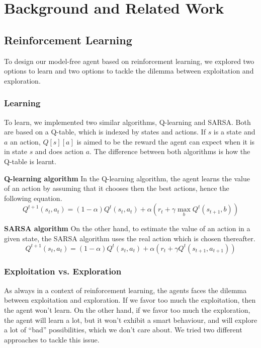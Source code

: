 \documentclass[journal, a4paper]{IEEEtran}
\begin{document}
\section{Background and Related Work}

\subsection{Reinforcement Learning}

To design our model-free agent based on reinforcement learning, we explored two options to learn and two options to tackle the dilemma between exploitation and exploration.

\subsubsection{Learning}

To learn, we implemented two similar algorithms, Q-learning and SARSA.
Both are based on a Q-table, which is indexed by states and actions. If $s$ is a state and $a$ an action, $Q[s][a]$ is aimed to be the reward the agent can expect when it is in state $s$ and does action $a$.
The difference between both algorithms is how the Q-table is learnt.

\textbf{Q-learning algorithm}
In the Q-learning algorithm, the agent learns the value of an action by assuming that it chooses then the best actions, hence the following equation.
\cite{lecture-rl}
\cite{lecture-rl2}
\cite{intro-rl}
\cite{qlearning}
\[
	Q^{t+1}(s_t, a_t) = (1-\alpha) Q^t(s_t, a_t) + \alpha (r_t + \gamma \max\limits_b Q^t(s_{t+1}, b))
\]

\textbf{SARSA algorithm}
On the other hand, to estimate the value of an action in a given state, the SARSA algorithm uses the real action which is chosen thereafter.
\cite{lecture-rl}
\cite{lecture-rl2}
\cite{intro-rl}
\cite{sarsa}
\[
	Q^{t+1}(s_t, a_t) = (1-\alpha) Q^t(s_t, a_t) + \alpha (r_t + \gamma Q^t(s_{t+1}, a_{t+1}))
\]

\subsubsection{Exploitation vs. Exploration}

As always in a context of reinforcement learning, the agents faces the dilemma between exploitation and exploration.
If we favor too much the exploitation, then the agent won't learn.
On the other hand, if we favor too much the exploration, the agent will learn a lot, but it won't exhibit a smart behaviour, and will explore a lot of ``bad'' possibilities, which we don't care about.
We tried two different approaches to tackle this issue.
\end{document}
